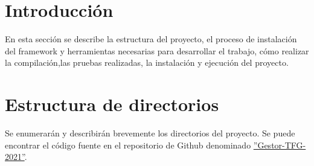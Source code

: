 
\section{Introducción}
En esta sección se describe la estructura del proyecto, el proceso de instalación del framework y herramientas necesarias para desarrollar el trabajo, cómo realizar la compilación,las pruebas realizadas, la instalación y ejecución del proyecto.

\section{Estructura de directorios}
Se enumerarán y describirán brevemente los directorios del proyecto. Se puede encontrar el código fuente en el repositorio de Github denominado \href{https://github.com/dbo1001/Gestor-TFG-2021}{''Gestor-TFG-2021''}.

